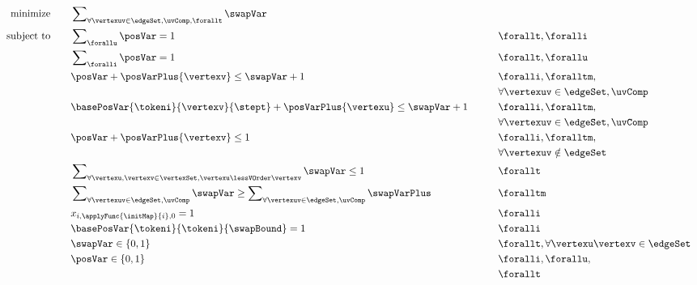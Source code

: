 \begin{align}
\text{minimize}   \qquad & \sum\nolimits_{\forall \vertexuv \in \edgeSet,\uvComp,\forallt} \swapVar & \label{equ:model-ts:m}\\
\text{subject to} \qquad & \sum\nolimits_{\forallu} \posVar = 1 & &\forallt, \foralli \label{equ:model-ts:1}\\
                  & \sum\nolimits_{\foralli} \posVar = 1 & &\forallt, \forallu \label{equ:model-ts:2}\\
                  & \posVar + \posVarPlus{\vertexv} \leq \swapVar + 1 \qquad & &\foralli, \foralltm, \nonumber\\
                  & & &\forall \vertexuv \in \edgeSet, \uvComp \label{equ:model-ts:3} \\
                  & \basePosVar{\tokeni}{\vertexv}{\stept} + \posVarPlus{\vertexu} \leq \swapVar + 1 \qquad & &\foralli, \foralltm, \nonumber\\ 
                  & & &\forall \vertexuv \in \edgeSet, \uvComp \label{equ:model-ts:4}\\
                  & \posVar + \posVarPlus{\vertexv} \leq 1 & &\foralli, \foralltm, \nonumber\\
                  & & &\forall \vertexuv \notin \edgeSet \label{equ:model-ts:5} \\
                  & \sum\nolimits_{\forall \vertexu,\vertexv \in \vertexSet, \vertexu\lessVOrder\vertexv} \swapVar \leq 1 & &\forallt \label{equ:model-ts:6} \\
                  & \sum\nolimits_{\forall \vertexuv \in \edgeSet,\uvComp} \swapVar \ge \sum\nolimits_{\forall \vertexuv \in \edgeSet,\uvComp} \swapVarPlus & & \foralltm \label{equ:model-ts:sym}\\
                  & x_{i, \applyFunc{\initMap}{i}, 0} = 1 & & \foralli \label{equ:model-ts:ini}\\
                  & \basePosVar{\tokeni}{\tokeni}{\swapBound} = 1 & &\foralli \label{equ:model-ts:7}\\
                  & \swapVar \in \{0,1\} & &\forallt, \forall \vertexu\vertexv \in \edgeSet \label{equ:model-ts:8}\\
                  & \posVar  \in \{0,1\} & &\foralli, \forallu, \nonumber\\
                  & & &\forallt \label{equ:model-ts:9}
\end{align}
